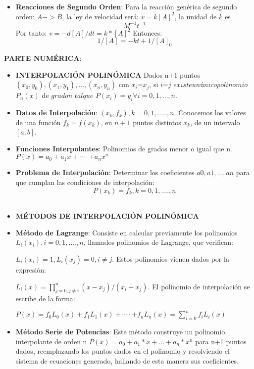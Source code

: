 \documentclass[10pt,a4paper]{article}
\begin{document}
\begin{multicols}{2}
\begin{itemize}
	\item \textbf{Reacciones de Segundo Orden}: Para la reacción genérica de segundo orden: $A ->B$, la ley de velocidad será: $v=k[A]^2$, la unidad de $k$ es \[M^{-1} t^{-1}\]
	Por tanto: 
	$v=-d[A]/dt=k*[A]^2$
	Entonces: \[1/[A] =-kt+  1/[A]_0 \]


\end{itemize}
\noindent \textbf{PARTE NUMÉRICA}:	
\begin{itemize}
	\item \textbf{INTERPOLACIÓN POLINÓMICA}
	Dados n+1 puntos $(x_0,y_0), (x_1,y_1), … , (x_n,y_n)$ con $x_i$\not=$x_j$, si $i$\not=$j$ $ existe un único polinomio $ $P_n (x)$ de $grado $\leq$ n$ $ tal que $ $P(x_i )=y_i  \forall i=0,1,…,n$.
	\item \textbf{Datos de Interpolación}: 
	${(x_k,f_k )} $$, k=0,1,…..,n$.
	Conocemos los valores de una función $f_k=f(x_k)$, en $n+1$ puntos distintos $x_k$, de un intervalo $[a,b]$.
	
	\item \textbf{Funciones Interpolantes}: Polinomios de grados menor o igual que n.
	$P(x)=a_0+a_1 x+⋯⋅+a_n x^n$

	\item \textbf{Problema de Interpolación}: Determinar los coeficientes $a0, a1,…, an$ para que cumplan las condiciones de interpolación: \[P(x_k )= f_k,k=0,1,….,n\]\\

	\item \textbf{MÉTODOS DE INTERPOLACIÓN POLINÓMICA}

	\item \textbf{Método de Lagrange}:
	Consiste en calcular previamente los polinomios  $L_i (x_i ),i=0,1,….,n$, llamados polinomios de Lagrange, que verifican:

	$L_i (x_i )=1,L_i (x_j )=0,i\not=j$.
	Estos polinomios vienen dados por la expresión:

	$L_i (x)=\prod_{j=0,j\not=i}^{n}(x-x_j)/(x_i-x_j )$.
	El polinomio de interpolación se escribe de la forma:
	
	$ P(x)=f_0 L_0 (x)+f_1 L_1 (x)+⋯⋅+f_n L_n (x)=\sum_{i=0}^{n}f_i L_i (x) $
	
	\item \textbf{Método Serie de Potencias}:
	Este método construye un polinomio interpolante de orden n $P(x)=a_0+a_1*x+...+a_n*x^n $ para n+1 puntos dados, reemplazando los puntos dados en el polinomio y resolviendo el sistema de ecuaciones generado, hallando de esta manera sus coeficientes.
	

\end{itemize}
\end{multicols}
\end{document}

